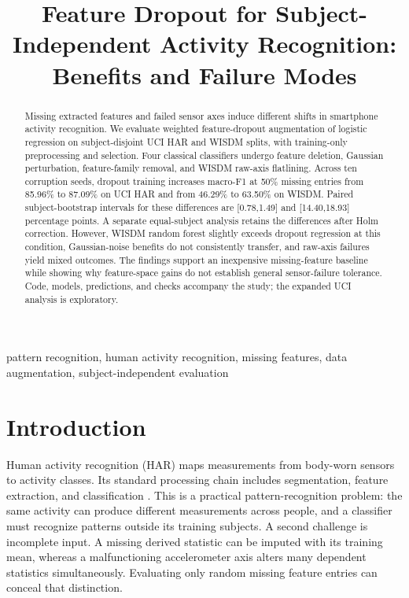 \documentclass[conference]{IEEEtran}
\begin{document}
\title{Feature Dropout for Subject-Independent Activity Recognition: Benefits and Failure Modes}
\author{}
\maketitle
\begin{abstract}
Missing extracted features and failed sensor axes induce different shifts in smartphone activity recognition. We evaluate weighted feature-dropout augmentation of logistic regression on subject-disjoint UCI HAR and WISDM splits, with training-only preprocessing and selection. Four classical classifiers undergo feature deletion, Gaussian perturbation, feature-family removal, and WISDM raw-axis flatlining. Across ten corruption seeds, dropout training increases macro-F1 at 50\% missing entries from 85.96\% to 87.09\% on UCI HAR and from 46.29\% to 63.50\% on WISDM. Paired subject-bootstrap intervals for these differences are [0.78,1.49] and [14.40,18.93] percentage points. A separate equal-subject analysis retains the differences after Holm correction. However, WISDM random forest slightly exceeds dropout regression at this condition, Gaussian-noise benefits do not consistently transfer, and raw-axis failures yield mixed outcomes. The findings support an inexpensive missing-feature baseline while showing why feature-space gains do not establish general sensor-failure tolerance. Code, models, predictions, and checks accompany the study; the expanded UCI analysis is exploratory.
\end{abstract}
\begin{IEEEkeywords}
pattern recognition, human activity recognition, missing features, data augmentation, subject-independent evaluation
\end{IEEEkeywords}

\section{Introduction}
Human activity recognition (HAR) maps measurements from body-worn sensors to activity classes. Its standard processing chain includes segmentation, feature extraction, and classification \cite{bulling2014}. This is a practical pattern-recognition problem: the same activity can produce different measurements across people, and a classifier must recognize patterns outside its training subjects. A second challenge is incomplete input. A missing derived statistic can be imputed with its training mean, whereas a malfunctioning accelerometer axis alters many dependent statistics simultaneously. Evaluating only random missing feature entries can conceal that distinction.
\end{document}
